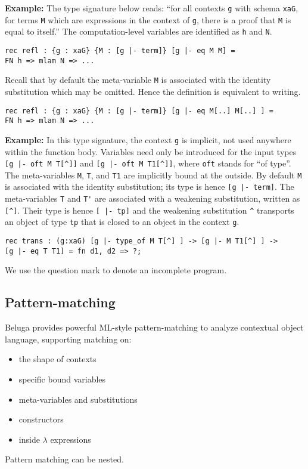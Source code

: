 \documentclass[11pt]{article}
\begin{document}
\textbf{Example:} The type signature below reads: ``for all contexts
\verb+g+ with schema \verb+xaG+, for terms \verb+M+ which are
expressions in the context of \verb+g+, there is a proof that
\verb+M+ is equal to itself.'' The computation-level variables are
identified as \verb+h+ and \verb+N+.

\begin{verbatim}
rec refl : {g : xaG} {M : [g |- term]} [g |- eq M M] =
FN h => mlam N => ...
\end{verbatim}

Recall that by default the meta-variable \verb+M+ is associated with the identity substitution which may be omitted.
Hence the definition is equivalent to writing.

\begin{verbatim}
rec refl : {g : xaG} {M : [g |- term]} [g |- eq M[..] M[..] ] =
FN h => mlam N => ...
\end{verbatim}

\textbf{Example:} In this type signature, the context \verb+g+ is implicit, not used anywhere within the function body.
Variables need only be introduced for the input types \verb+[g |- oft M T[^]]+ and \verb+[g |- oft M T1[^]]+, where \verb+oft+ stands for ``of type''.
The meta-variables \verb+M+, \verb+T+, and \verb+T1+ are implicitly bound at the outside.
By default \verb+M+ is associated with the identity substitution; its type is hence \verb+[g |- term]+.
The meta-variables \verb+T+ and \verb+T'+ are associated with a weakening substitution, written as \verb+[^]+.
Their type is hence \verb+[ |- tp]+ and the weakening substitution \verb+^+ transports an object of type \verb+tp+ that is closed to an object in the context \verb+g+.

\begin{verbatim}
rec trans : (g:xaG) [g |- type_of M T[^] ] -> [g |- M T1[^] ] ->
[g |- eq T T1] = fn d1, d2 => ?;
\end{verbatim}

We use the question mark to denote an incomplete program.

\subsection{Pattern-matching}
Beluga provides powerful ML-style pattern-matching to analyze contextual object language, supporting matching on:
\begin{itemize}
\item the shape of contexts
\item specific bound variables
\item meta-variables and substitutions
\item constructors
\item inside $\lambda$ expressions
\end{itemize}
Pattern matching can be nested.
\end{document}
